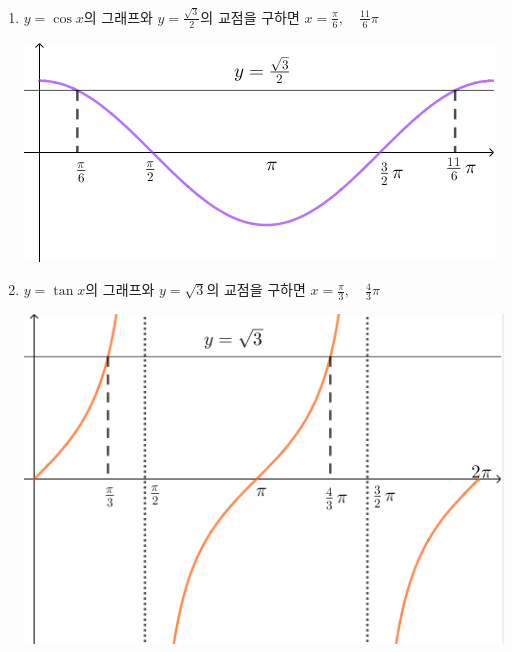 \documentclass{oblivoir}
\begin{document}
\begin{mdframed}[frametitle=그래프를 사용하는 방법,nobreak=false]
\begin{enumerate}
\item
\(y=\cos x\)의 그래프와 \(y=\frac{\sqrt3}2\)의 교점을 구하면
\(x=\frac\pi6,\quad\frac{11}6\pi\)
\begin{center}
\includegraphics[width=.7\textwidth]{equa_1-3}
\end{center}
\newpage
\item
\(y=\tan x\)의 그래프와 \(y=\sqrt3\)의 교점을 구하면
\(x=\frac\pi3,\quad\frac43\pi\)
\begin{center}
\includegraphics[width=.7\textwidth]{equa_1-4}
\end{center}
\end{enumerate}
\end{mdframed}
\end{document}
